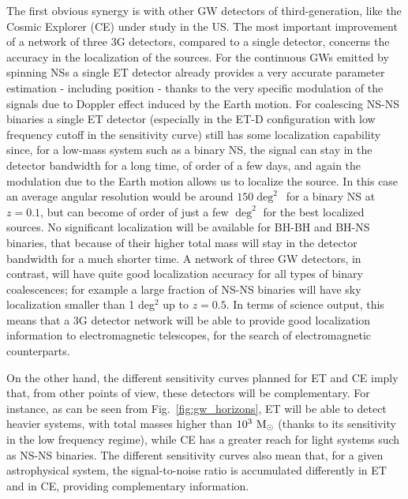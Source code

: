 The first obvious synergy is with other GW detectors of third-generation, like the Cosmic Explorer (CE) under study in the US. The most important improvement of a network of three 3G detectors, compared to a single detector, concerns the accuracy in the localization of the sources. For the continuous GWs emitted by spinning NSs a single ET detector  already provides a very accurate parameter estimation - including position - thanks to the very specific modulation of the signals due to Doppler effect induced by the Earth motion.   For coalescing NS-NS binaries a single ET detector (especially in the ET-D configuration with low frequency cutoff in the sensitivity curve) still has some localization capability since, for a low-mass system such as a binary NS, the signal can stay in the detector bandwidth for a long time,  of order of a few days, and again the modulation due to  the Earth motion allows us to localize the source. In this case  an average angular resolution would be around  $150\deg^2$\, for a binary NS at $z=0.1$, but can become of order of just a few $\deg^2$ for the best localized 
sources.
No significant localization will be available for BH-BH and BH-NS binaries, that because of their higher total mass will stay in the detector bandwidth for a much shorter time.
A  network of three GW detectors, in contrast, will have quite  good localization accuracy  for all types of binary coalescences; for example a large fraction of NS-NS binaries will have sky localization smaller than 1 deg$^2$ up to $z=0.5$. 
In terms of science output, this means that a 3G detector network will be able to provide good localization information to electromagnetic telescopes, for the search of electromagnetic counterparts. 


On the other hand, the different sensitivity curves planned for  ET and CE imply that, from other points of view, these detectors will be complementary. For instance,  as can be seen from  Fig.~\ref{fig:gw_horizons}, ET will be  able to detect heavier systems, with total masses  higher than $10^3~\mathrm{M}_{\odot}$ (thanks to its sensitivity in the low frequency regime), while CE has a greater reach  for light systems such as NS-NS binaries.
The different sensitivity curves also mean that, for a given astrophysical system, the signal-to-noise ratio is accumulated differently in ET and in CE, providing complementary information.




